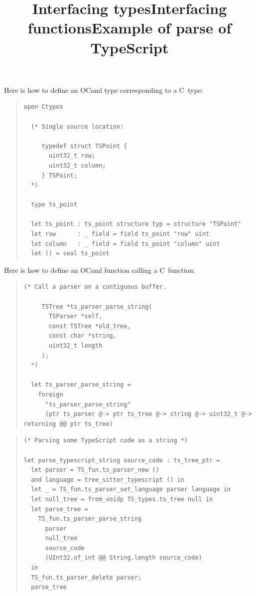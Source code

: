\documentclass[wide]{slides}
\newcommand{\OCaml}[0]{\textsf{OCaml}}
\begin{document}
\begin{slide}
  \title{Interfacing types}

  Here is how to define an \OCaml{} type corresponding to a C~type:
  \begin{quote}
    \small
  \begin{lstlisting}[language=caml]
  open Ctypes

  (* Single source location:

     typedef struct TSPoint {
       uint32_t row;
       uint32_t column;
     } TSPoint;
  *)

  type ts_point

  let ts_point : ts_point structure typ = structure "TSPoint"
  let row      : _ field = field ts_point "row" uint
  let column   : _ field = field ts_point "column" uint
  let () = seal ts_point
  \end{lstlisting}
  \end{quote}

\end{slide}

\begin{slide}
  \title{Interfacing functions}

  Here is how to define an \OCaml{} function calling a C~function:
  \begin{quote}
    \begin{lstlisting}[language=caml]
  (* Call a parser on a contiguous buffer.

     TSTree *ts_parser_parse_string(
       TSParser *self,
       const TSTree *old_tree,
       const char *string,
       uint32_t length
     );
  *)

  let ts_parser_parse_string =
    foreign
      "ts_parser_parse_string"
      (ptr ts_parser @-> ptr ts_tree @-> string @-> uint32_t @-> returning @@ ptr ts_tree)
    \end{lstlisting}
  \end{quote}

\end{slide}

\begin{slide}
  \title{Example of parse of TypeScript}
  \begin{quote}
    \begin{lstlisting}[language=caml]
(* Parsing some TypeScript code as a string *)

let parse_typescript_string source_code : ts_tree_ptr =
  let parser = TS_fun.ts_parser_new ()
  and language = tree_sitter_typescript () in
  let _ = TS_fun.ts_parser_set_language parser language in
  let null_tree = from_voidp TS_types.ts_tree null in
  let parse_tree =
    TS_fun.ts_parser_parse_string
      parser
      null_tree
      source_code
      (UInt32.of_int @@ String.length source_code)
  in
  TS_fun.ts_parser_delete parser;
  parse_tree
    \end{lstlisting}
  \end{quote}

\end{slide}
\end{document}
